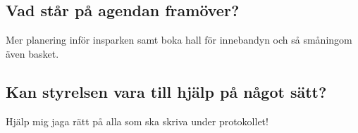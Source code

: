 \documentclass[a4paper]{article}
\begin{document}
	\subsection{Vad står på agendan framöver?}
	Mer planering inför insparken samt boka hall för innebandyn och så småningom även basket.
	\subsection{Kan styrelsen vara till hjälp på något sätt?}
	Hjälp mig jaga rätt på alla som ska skriva under protokollet!
\end{document}
